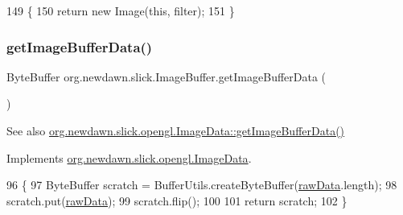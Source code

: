 \begin{DoxyCode}
149                                       \{
150         \textcolor{keywordflow}{return} \textcolor{keyword}{new} Image(\textcolor{keyword}{this}, filter);
151     \}
\end{DoxyCode}
\mbox{\label{classorg_1_1newdawn_1_1slick_1_1_image_buffer_a70b5c0d88ff0fff39cb5bf73a18e402d}} 
\subsubsection{\texorpdfstring{get\+Image\+Buffer\+Data()}{getImageBufferData()}}
{\footnotesize\ttfamily Byte\+Buffer org.\+newdawn.\+slick.\+Image\+Buffer.\+get\+Image\+Buffer\+Data (\begin{DoxyParamCaption}{ }\end{DoxyParamCaption})\hspace{0.3cm}{\ttfamily [inline]}}

\begin{DoxySeeAlso}{See also}
\mbox{\hyperlink{interfaceorg_1_1newdawn_1_1slick_1_1opengl_1_1_image_data_a7b15d49f552cad075bb1179668ce5250}{org.\+newdawn.\+slick.\+opengl.\+Image\+Data\+::get\+Image\+Buffer\+Data()}} 
\end{DoxySeeAlso}


Implements \mbox{\hyperlink{interfaceorg_1_1newdawn_1_1slick_1_1opengl_1_1_image_data_a7b15d49f552cad075bb1179668ce5250}{org.\+newdawn.\+slick.\+opengl.\+Image\+Data}}.


\begin{DoxyCode}
96                                            \{
97         ByteBuffer scratch = BufferUtils.createByteBuffer(\mbox{\hyperlink{classorg_1_1newdawn_1_1slick_1_1_image_buffer_a868ea7115032600267528b6894d8c8be}{rawData}}.length);
98         scratch.put(\mbox{\hyperlink{classorg_1_1newdawn_1_1slick_1_1_image_buffer_a868ea7115032600267528b6894d8c8be}{rawData}});
99         scratch.flip();
100         
101         \textcolor{keywordflow}{return} scratch;
102     \}
\end{DoxyCode}
\mbox{\label{classorg_1_1newdawn_1_1slick_1_1_image_buffer_a708c22250dc3f4d73eded038f57108f7}} 
